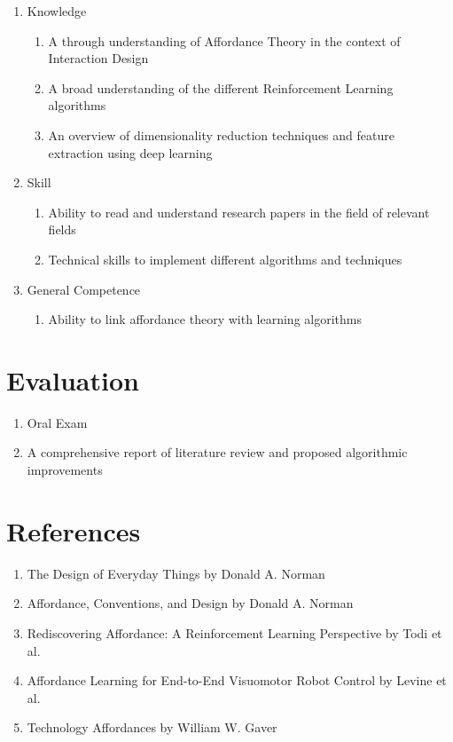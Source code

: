 \documentclass[letterpaper,12pt]{article}
\begin{document}
\begin{enumerate}
	\item Knowledge
	\begin{enumerate}
		\item A through understanding of Affordance Theory in the context of Interaction Design
		\item A broad understanding of the different Reinforcement Learning algorithms
		\item An overview of dimensionality reduction techniques and feature extraction using deep learning
	\end{enumerate}
	\item Skill
	\begin{enumerate}
		\item Ability to read and understand research papers in the field of relevant fields
		\item Technical skills to implement different algorithms and techniques
	\end{enumerate}
	\item General Competence
	\begin{enumerate}
		\item Ability to link affordance theory with learning algorithms
	\end{enumerate}
\end{enumerate}

\section{Evaluation}

\begin{enumerate}
	\item Oral Exam
	\item A comprehensive report of literature review and proposed algorithmic improvements
\end{enumerate}

\section{References}

\begin{enumerate}
	\item The Design of Everyday Things by Donald A. Norman
	\item Affordance, Conventions, and Design by Donald A. Norman
	\item Rediscovering Affordance:
	A Reinforcement Learning Perspective by Todi et al.
	\item Affordance Learning for End-to-End Visuomotor Robot Control by Levine et al.
	\item Technology Affordances by William W. Gaver
\end{enumerate}
\end{document}
